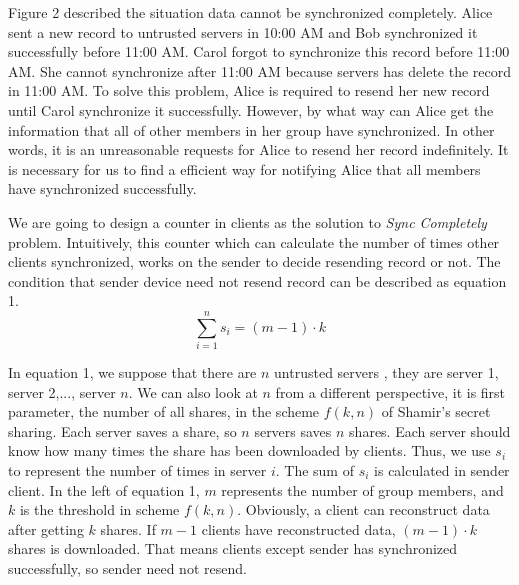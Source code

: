 \documentclass[twocolumn,10pt]{article}
\begin{document}
Figure 2 described the situation data cannot be synchronized completely. Alice sent a new record to untrusted servers in 10:00 AM and Bob synchronized it successfully before 11:00 AM. Carol forgot to synchronize this record before 11:00 AM. She cannot synchronize after 11:00 AM because servers has delete the record in 11:00 AM. To solve this problem, Alice is required to resend her new record until Carol synchronize it successfully. However, by what way can Alice get the information that all of other members in her group have synchronized. In other words, it is an unreasonable requests for Alice to resend her record indefinitely. It is necessary for us to find a efficient way for notifying Alice that all members have synchronized successfully.

We are going to design a counter in clients as the solution to \emph{Sync Completely} problem. Intuitively, this counter which can calculate the number of times other clients synchronized, works on the sender to decide resending record or not. The condition that sender device need not resend record can be described as equation 1.
\begin{equation}
\sum_{i=1}^{n}s_{i}=(m-1)\cdot k
\end{equation}

In equation 1, we suppose that there are $n$ untrusted servers , they are server 1, server 2,..., server $n$. We can also look at $n$ from a different perspective, it is first parameter, the number of all shares, in the scheme $f(k, n)$ of Shamir's secret sharing. Each server saves a share, so $n$ servers saves $n$ shares. Each server should know how many times the share has been downloaded by clients. Thus, we use $s_i$ to represent the number of times in server $i$. The sum of $s_i$ is calculated in sender client. In the left of equation 1, $m$ represents the number of group members, and $k$ is the threshold in scheme $f(k, n)$. Obviously, a client can reconstruct data after getting $k$ shares. If $m-1$ clients have reconstructed data, $(m-1)\cdot k$ shares is downloaded. That means clients except sender has synchronized successfully, so sender need not resend.
\end{document}
